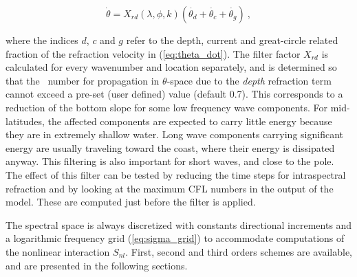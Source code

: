 
\begin{equation}
\dot{\theta} = X_{rd}(\lambda,\phi,k)\left( \dot{\theta_d} + 
\dot{\theta_c} + \dot{\theta_g} \right)\: , \label{eq:theta_filter} \end{equation}

\noindent
where the indices $d$, $c$ and $g$ refer to the depth, current and great-circle
related fraction of the refraction velocity in (\ref{eq:theta_dot}). The
filter factor $X_{rd}$ is calculated for every wavenumber and location
separately, and is determined so that the \cfl\ number for propagation in
$\theta$-space due to the {\em depth} refraction term cannot exceed a pre-set
(user defined) value (default 0.7). This corresponds to a reduction of the
bottom slope for some low frequency wave components. For mid-latitudes, the
affected components are expected to carry little energy because they are in
extremely shallow water. Long wave components carrying significant energy are
usually traveling toward the coast, where their energy is dissipated
anyway. This filtering is also important for short waves, and close to the
pole. The effect of this filter can be tested by reducing the time steps for
intraspectral refraction and by looking at the maximum CFL numbers in the
output of the model.  These are computed just before the filter is applied.



The spectral space is always discretized with constants directional increments
and a logarithmic frequency grid (\ref{eq:sigma_grid}) to accommodate
computations of the nonlinear interaction $S_{nl}$. First, second and third
orders schemes are available, and are presented in the following sections.